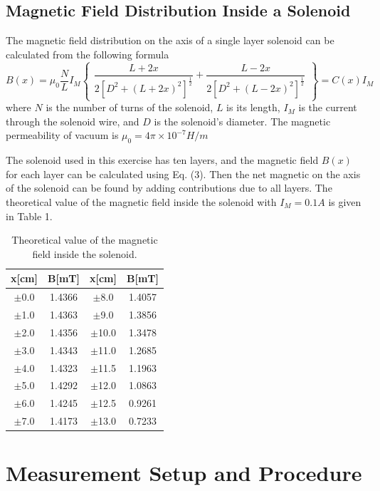 \documentclass{article}
\begin{document}
\subsection{Magnetic Field Distribution Inside a Solenoid}

The magnetic field distribution on the axis of a single layer solenoid can be calculated from the following formula
\begin{equation}
	B(x)=\mu_0\dfrac{N}{L}I_M\begin{Bmatrix}
	\dfrac{L+2x}{2[D^2+(L+2x)^2]^{\frac{1}{2}}}+\dfrac{L-2x}{2[D^2+(L-2x)^2]^{\frac{1}{2}}}
	\end{Bmatrix}=C(x)I_M
\end{equation}
where $ N $ is the number of turns of the solenoid, $ L $ is its length, $ I_M $ is the current through the solenoid wire, and $ D $ is the solenoid's diameter. The magnetic permeability of vacuum is $ \mu_0=4\pi\times10^{-7}H/m $

The solenoid used in this exercise has ten layers, and the magnetic field $ B(x) $ for each layer can be calculated using Eq. (3). Then the net magnetic on the axis of the solenoid can be found by adding contributions due to all layers. The theoretical value of the magnetic field inside the solenoid with $ I_M = 0.1 A $ is given in Table 1.
\begin{table}[H]
	\centering
	\begin{tabular}{|c|c||c|c|}
		\hline
		x[cm]     & B[mT]      &    x[cm]   & B[mT] \\
		\hline
		$ \pm $0.0     & 1.4366  & $\pm$8.0     & 1.4057  \\
		$\pm$1.0     & 1.4363  & $\pm$9.0     & 1.3856  \\
		$\pm$2.0     & 1.4356  & $\pm$10.0    & 1.3478  \\
		$\pm$3.0     & 1.4343  & $\pm$11.0    & 1.2685  \\
		$\pm$4.0     & 1.4323  & $\pm$11.5  & 1.1963  \\
		$\pm$5.0     & 1.4292  & $\pm$12.0    & 1.0863  \\
		$\pm$6.0     & 1.4245  & $\pm$12.5  & 0.9261  \\
		$\pm$7.0     & 1.4173  & $\pm$13.0    & 0.7233  \\
		\hline
	\end{tabular}
	\caption{Theoretical value of the magnetic field inside the solenoid.}
\end{table}


\section{Measurement Setup and Procedure}
\end{document}
